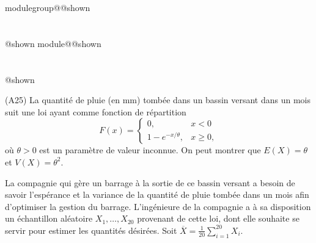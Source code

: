 \documentclass{Evaluation}
\makeatletter
\newcommand{\currentmodulekey}{}
\newcommand{\currentmoduletitle}{}
\newcommand{\currentgroupkey}{}
\newcommand{\currentgrouptitle}{}
\newcommand{\showmoduleifneeded}{%
  \ifx\currentgroupkey\empty\else
    \expandafter\ifx\csname modulegroup@\currentgroupkey @shown\endcsname\relax
      \section*{\currentgrouptitle}%
      \expandafter\gdef\csname modulegroup@\currentgroupkey @shown\endcsname{1}%
    \fi
  \fi
  \expandafter\ifx\csname module@\currentmodulekey @shown\endcsname\relax
    \section*{\currentmoduletitle}%
    \expandafter\gdef\csname module@\currentmodulekey @shown\endcsname{1}%
  \fi
}
\newenvironment{A25}{\showmoduleifneeded}{}
\makeatother
\begin{document}
\begin{questions}
\begin{A25}
\question (A25) La quantité de pluie (en mm) tombée dans un bassin versant
dans un mois suit une loi ayant comme fonction de répartition
$$F(x)=\left\{\begin{array}{ll}
0, & x<0\\
1-e^{-x/\theta}, & x\ge 0,
\end{array}\right.$$
où $\theta>0$ est un paramètre de valeur inconnue. On peut montrer que $E(X)=\theta$ et $V(X)=\theta^2$.

La compagnie qui gère un barrage à la sortie de ce bassin versant a besoin de savoir l'espérance et la variance de la quantité de pluie tombée
dans un mois afin d'optimiser la gestion du barrage. L'ingénieure de la compagnie a à sa disposition un échantillon aléatoire $X_1,\dots,X_{20}$
provenant de cette loi, dont elle souhaite se servir pour estimer les quantités désirées. Soit $\displaystyle \overline{X}=\frac{1}{20}\sum_{i=1}^{20}X_i$.

\end{A25}
\end{questions}
\end{document}
